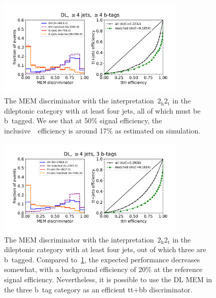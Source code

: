 \begin{figure}[ht]
\begin{centering}
\includegraphics[width = 0.8\textwidth]{figures/mem/mem_dl_jge4_tge4.pdf}
\caption[MEM with the~$2_{\mathrm{h}} 2_{\mathrm{t}}$ interpretation in the dileptonic $\ge4$ jet, $\ge4$ b~tag category]{The MEM discriminator with the interpretation~$2_{\mathrm{h}} 2_{\mathrm{t}}$ in the dileptonic category with at least four jets, all of which must be b~tagged. We see that at 50\% signal efficiency, the inclusive~\ttbar~efficiency is around 17\% as estimated on simulation.}
\label{fig:mem_dl_jge4_tge4}
\end{centering}
\end{figure}

\begin{figure}[ht]
\begin{centering}
\includegraphics[width = 0.8\textwidth]{figures/mem/mem_dl_jge4_t3.pdf}
\caption[MEM with the~$2_{\mathrm{h}} 2_{\mathrm{t}}$ interpretation in the dileptonic $\ge4$ jet, 3 b~tag category]{The MEM discriminator with the interpretation~$2_{\mathrm{h}} 2_{\mathrm{t}}$ in the dileptonic category with at least four jets, out of which three are b~tagged. Compared to~\cref{fig:mem_dl_jge4_tge4}, the expected performance decreases somewhat, with a background efficiency of 20\% at the reference signal efficiency. Nevertheless, it is possible to use the DL MEM in the three b~tag category as an efficient tt+bb discriminator.}
\label{fig:mem_dl_jge4_t3}
\end{centering}
\end{figure}

